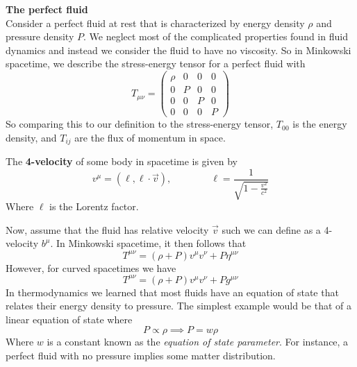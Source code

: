 \documentclass{article}
\begin{document}
 		\begin{exmp}
 			\textbf{The perfect fluid} \\
 			Consider a perfect fluid at rest that is characterized by energy density $\rho$ and pressure density $P$. We neglect most of the complicated properties found in fluid dynamics and instead we consider the fluid to have no viscosity. So in Minkowski spacetime, we describe the stress-energy tensor for a perfect fluid with
 			\begin{equation}
 				\label{SET-PerfectFluid}
 				T_{\mu\nu} = \begin{pmatrix}
 					\rho & 0 & 0 & 0 \\
 					0 & P & 0 & 0 \\
 					0 & 0 & P & 0 \\
 					0 & 0 & 0 & P
 				\end{pmatrix}
 			\end{equation}
 			So comparing this to our definition to the stress-energy tensor, $T_00$ is the energy density, and $T_{ij}$ are the flux of momentum in space.
 			
 			\begin{defn}
 				The \textbf{4-velocity} of some body in spacetime is given by
 				\begin{equation}
 					\label{4velocity}
 					v^{\mu} = \left( \ell, \ell \cdot{\vec{v}} \right), \quad\quad\quad\quad \ell = \frac{1}{\sqrt{1-\frac{{v}^2}{c^2}}}
 				\end{equation}
 				Where $\ell$ is the Lorentz factor.
 			\end{defn}
 			Now, assume that the fluid has relative velocity $\vec{v}$ such we can define as a 4-velocity $b^\mu$. In Minkowski spacetime, it then follows that
 			\begin{equation}
 				\label{SET-InverseFlat}
 				T^{\mu\nu} = \left(\rho + P\right)v^\mu v^\nu + P \eta^{\mu\nu}
 			\end{equation}
 			However, for curved spacetimes we have
 			\begin{equation}
 				\label{SET-InverseCurved}
 				\boxed{T^{\mu\nu} = \left( \rho+P\right) v^\mu v^\nu + P g^{\mu\nu}}
 			\end{equation}
 			In thermodynamics we learned that most fluids have an equation of state that relates their energy density to pressure. The simplest example would be that of a linear equation of state where 
 			\begin{equation}
 				\label{eq:EquationOfState}
 				P \propto \rho \implies \boxed{P = w \rho}
 			\end{equation}
 			Where $w$ is a constant known as the \textit{equation of state parameter}. For instance, a perfect fluid with no pressure implies some matter distribution.
 			

\end{exmp}
\end{document}
